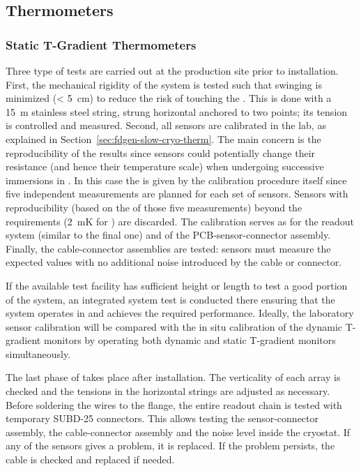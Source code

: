 
\subsection{Thermometers}
\label{sec:fdgen-slow-cryo-qc-th}

\subsubsection{Static T-Gradient Thermometers}
\label{sec:fdgen-slow-cryo-qc-thst}


Three type of tests are carried out at the production site prior to installation. First, the mechanical rigidity of the system is tested such that swinging is minimized (< \SI{5}{cm})
to reduce the risk of touching the . This is done with a \SI{15}{m} stainless steel string, strung horizontal anchored to two points; its tension is controlled and measured. 
Second, %
all sensors are calibrated in the lab, as explained in Section~\ref{sec:fdgen-slow-cryo-therm}.
The main concern is the reproducibility of the results since sensors could potentially change their resistance (and hence their temperature scale)
when undergoing successive immersions in \lar{}. In this case the  is given by the calibration procedure itself since five independent measurements
are planned for each set of sensors. Sensors with reproducibility (based on the \rms of those five measurements) beyond the requirements (\SI{2}{mK} for ) are discarded.  
The calibration serves as  for the readout system (similar to the final one) and of the PCB-sensor-connector assembly. Finally, the cable-connector assemblies are tested: sensors must measure the expected values with no additional noise introduced by the cable or connector. 

If the available \lar test facility has sufficient height or length to test a good portion of the system, an integrated system test is conducted there ensuring that the system
operates in \lar and achieves the required performance. Ideally, the laboratory sensor calibration will be compared with the in situ calibration
of the dynamic T-gradient monitors by operating both dynamic and static T-gradient monitors simultaneously.   

The last phase of  takes place after installation. %
The verticality of each array is checked and the tensions in the horizontal strings are adjusted as necessary.
Before soldering the wires to the flange, the entire readout chain is tested with temporary SUBD-25 connectors. 
This allows testing the sensor-connector assembly, the cable-connector assembly and the noise level inside the cryostat.
If any of the sensors gives a problem, it is replaced. If the problem persists, the cable is checked and replaced if needed.


